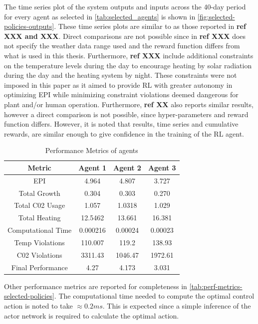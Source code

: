 The time series plot of the system outputs and inputs across the 40-day period for every agent as selected in \autoref{tab:selected_agents} is shown in \autoref{fig:selected-policies-outputs}. These time series plots are similar to as those reported in \textbf{ref XXX and XXX}. Direct comparisons are not possible since in \textbf{ref XXX} does not specify the weather data range used and the reward function differs from what is used in this thesis. Furthermore, \textbf{ref XXX} include additional constraints on the temperature levels during the day to encourage heating by solar radiation during the day and the heating system by night. These constraints were not imposed in this paper as it aimed to provide RL with greater autonomy in optimizing EPI while minimizing constraint violations deemed dangerous for plant and/or human operation. Furthermore, \textbf{ref XX} also reports similar results, however a direct comparison is not possible, since hyper-parameters and reward function differs. However, it is noted that results, time series and cumulative rewards, are similar enough to give confidence in the training of the RL agent.

\begin{table}[H]
    \centering
    \begin{tabular}{|c|c|c|c|}
    \hline
         Metric& Agent 1 & Agent 2 & Agent 3  \\
         \hline
         EPI                &4.964      & 4.807     &3.727 \\
         Total Growth       &0.304      &0.303      &0.270 \\
         Total C02 Usage    &1.057      &1.0318     &1.029 \\
         Total Heating      &12.5462    &13.661     &16.381 \\
         Computational Time &0.000216   &0.00024    &0.00023 \\
         Temp Violations    &110.007    &119.2      &138.93 \\
         C02 Violations     &3311.43    &1046.47    &1972.61 \\
          Final Performance &4.27       &4.173      &3.031 \\ 
         \hline
    \end{tabular}
    \caption{Performance Metrics of agents}
    \label{tab:perf-metrics-selected-policies}
\end{table}


 Other performance metrics are reported for completeness in \autoref{tab:perf-metrics-selected-policies}. The computational time needed to compute the optimal control action is noted to take $\approx 0.2ms$. This is expected since a simple inference of the actor network is required to calculate the optimal action.
 
